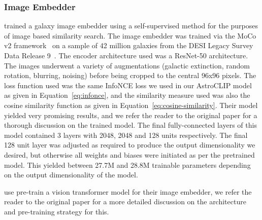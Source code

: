 \subsubsection{Image Embedder}\label{subsubsec:image-embedder}
\cite{stein2021} trained a galaxy image embedder using a self-supervised method for the purposes of image based similarity search.
The image embedder was trained via the MoCo v2 framework~\citep{moco2020, mocov22020} on a sample of 42 million galaxies
from the DESI Legacy Survey Data Release 9~\citep{desilegacy2018}.
The encoder architecture used was a ResNet-50 architecture.
The images underwent a variety of augmentations (galactic extinction, random rotation, blurring, noising) before
being cropped to the central 96x96 pixels.
The loss function used was the same InfoNCE loss we used in our AstroCLIP model as given in Equation~\eqref{eq:infonce},
and the similarity measure used was also the cosine similarity function as given in Equation~\eqref{eq:cosine-similarity}.
Their model yielded very promising results, and we refer the reader to the original paper for a thorough discussion
on the trained model.
The final fully-connected layers of this model contained 3 layers with 2048, 2048 and 128 units respectively.
The final 128 unit layer was adjusted as required to produce the output dimensionality we desired, but otherwise all
weights and biases were initiated as per the pretrained model.
This yielded between 27.7M and 28.8M trainable parameters depending on the output dimensionality of the model.

\cite{astroclip} use pre-train a vision transformer model for their image embedder, we refer the reader to the original paper
for a more detailed discussion on the architecture and pre-training strategy for this.

